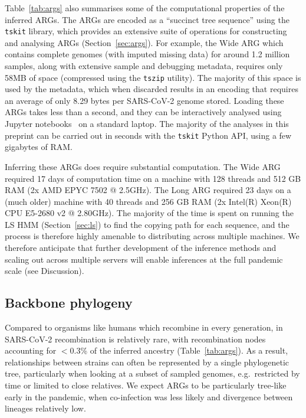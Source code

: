 \documentclass{article}
\begin{document}
Table~\ref{tab:args} also summarises some of the computational
properties of the inferred ARGs.
The ARGs are encoded as a ``succinct tree sequence'' using
the \texttt{tskit} library, which provides an extensive
suite of operations for constructing and analysing ARGs
(Section~\ref{sec:args}). For example, the Wide ARG
which contains complete genomes (with imputed missing data)
for around 1.2 million samples, along with extensive sample
and debugging metadata, requires only 58MB of space (compressed
using the \texttt{tszip} utility). The majority of this
space is used by the metadata, which when discarded results in
an encoding that requires an average of only 8.29 bytes per
SARS-CoV-2 genome stored.
Loading these ARGs takes less than a second, and they can be interactively
analysed using Jupyter notebooks~\citep{Kluyver2016-jupyter}
on a standard laptop. The majority
of the analyses in this preprint can be carried out in seconds
with the \texttt{tskit} Python API, using a few gigabytes of RAM.

Inferring these ARGs does require substantial computation.
The Wide ARG required 17 days of computation time on a machine with
128 threads and 512 GB RAM (2x AMD EPYC 7502 @ 2.5GHz). The Long ARG
required 23 days on a (much older) machine with 40 threads and 256 GB RAM (2x
Intel(R) Xeon(R) CPU E5-2680 v2 @ 2.80GHz). The majority of the time is spent
on running the LS HMM (Section~\ref{sec:ls}) to find the copying
path for each sequence, and the process
is therefore highly amenable to distributing across multiple machines.
We therefore anticipate that further development of the
inference methods and scaling out across multiple servers will
enable inferences at the full pandemic scale
(see Discussion).

\subsection{Backbone phylogeny}
\label{sec:backbone_phylogeny}
Compared to organisms like humans which recombine in every generation,
in SARS-CoV-2 recombination is relatively rare, with recombination nodes accounting
for $<$0.3\% of the inferred ancestry (Table~\ref{tab:args}). As a result,
relationships between strains can often be represented by a
single phylogenetic tree, particularly when looking at
a subset of sampled genomes, e.g.\ restricted by time or limited to close
relatives. We expect ARGs to be particularly tree-like
early in the pandemic, when co-infection was less likely and divergence between
lineages relatively low.
\end{document}
